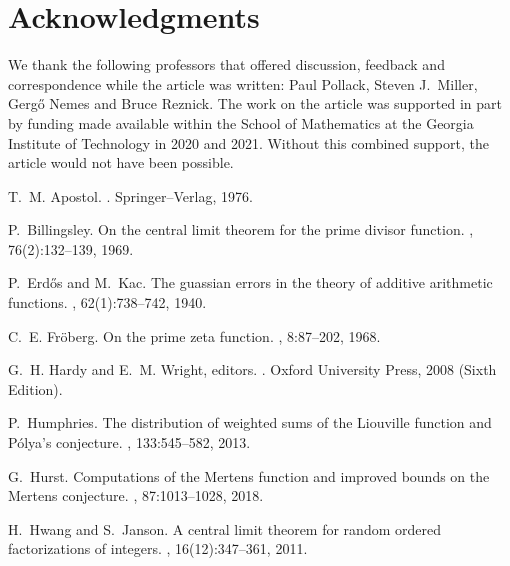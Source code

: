 \documentclass[11pt,reqno,a4letter]{article}
\numberwithin{figure}{section}
\numberwithin{table}{section}
\theoremstyle{plain}
\numberwithin{theorem}{section}
\theoremstyle{definition}
\begin{document}
\section*{Acknowledgments}

We thank the following professors that offered 
discussion, feedback and correspondence while the article was written: 
Paul Pollack, Steven J.~Miller, Gerg\H{o} Nemes and Bruce Reznick. 
The work on the article was supported in part by 
funding made available within the School of Mathematics at the 
Georgia Institute of Technology in 2020 and 2021. 
Without this combined support, the article would not have been possible.

\newpage 
\renewcommand{\refname}{References} 


\begin{thebibliography}{10}

T.~M. Apostol.
.
\newblock Springer--Verlag, 1976.

P.~Billingsley.
\newblock On the central limit theorem for the prime divisor function.
, 76(2):132--139, 1969.

P.~Erd{\H{o}}s and M.~Kac.
\newblock The guassian errors in the theory of additive arithmetic functions.
, 62(1):738--742, 1940.

C.~E. Fr{\"{o}}berg.
\newblock On the prime zeta function.
, 8:87--202, 1968.

G.~H. Hardy and E.~M. Wright, editors.
.
\newblock Oxford University Press, 2008 (Sixth Edition).

P.~Humphries.
\newblock The distribution of weighted sums of the {L}iouville function and
  {P}\'{o}lya's conjecture.
, 133:545--582, 2013.

G.~Hurst.
\newblock Computations of the {M}ertens function and improved bounds on the
  {M}ertens conjecture.
, 87:1013--1028, 2018.

H.~Hwang and S.~Janson.
\newblock A central limit theorem for random ordered factorizations of
  integers.
, 16(12):347--361, 2011.


\end{thebibliography}
\end{document}
